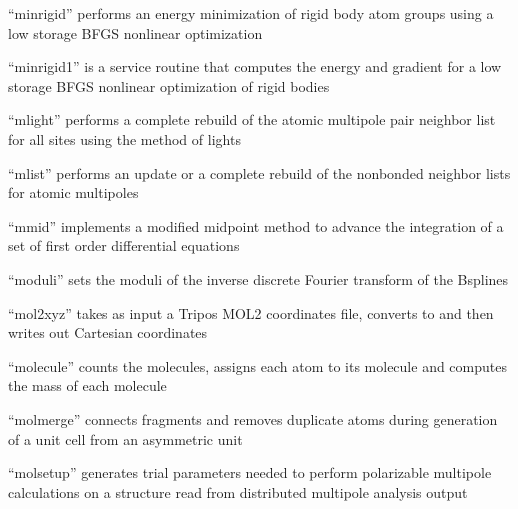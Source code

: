 \documentclass[letterpaper,11pt,english]{sphinxmanual}
\begin{document}

“minrigid” performs an energy minimization of rigid body atom
groups using a low storage BFGS nonlinear optimization


“minrigid1” is a service routine that computes the energy
and gradient for a low storage BFGS nonlinear optimization
of rigid bodies


“mlight” performs a complete rebuild of the atomic multipole
pair neighbor list for all sites using the method of lights


“mlist” performs an update or a complete rebuild of the
nonbonded neighbor lists for atomic multipoles


“mmid” implements a modified midpoint method to advance the
integration of a set of first order differential equations







“moduli” sets the moduli of the inverse discrete Fourier
transform of the B\sphinxhyphen{}splines


“mol2xyz” takes as input a Tripos MOL2 coordinates file,
converts to and then writes out Cartesian coordinates


“molecule” counts the molecules, assigns each atom to
its molecule and computes the mass of each molecule


“molmerge” connects fragments and removes duplicate atoms
during generation of a unit cell from an asymmetric unit


“molsetup” generates trial parameters needed to perform
polarizable multipole calculations on a structure read
from distributed multipole analysis output
\end{document}

